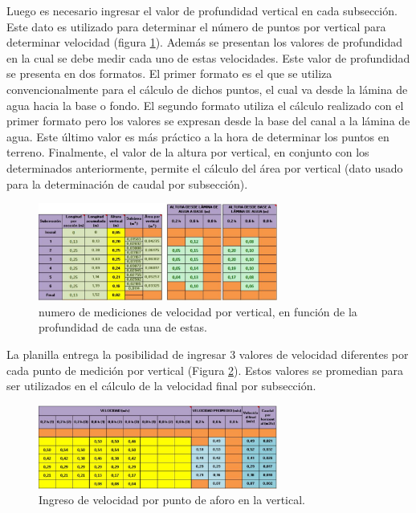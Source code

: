 \documentclass[]{article}
\begin{document}
Luego es necesario ingresar el valor de profundidad vertical en cada subsección. Este dato es utilizado para determinar el número de puntos por vertical para determinar velocidad (figura \ref{pto_vert}). Además se presentan los valores de profundidad en la cual se debe medir cada uno de estas velocidades. Este valor de profundidad se presenta en dos formatos. El primer formato es el que se utiliza convencionalmente para el cálculo de dichos puntos, el cual va desde la lámina de agua hacia la base o fondo. El segundo formato utiliza el cálculo realizado con el primer formato pero los valores se expresan desde la base del canal a la lámina de agua. Este último valor es más práctico a la hora de determinar los puntos en terreno. Finalmente, el valor de la altura por vertical, en conjunto con los determinados anteriormente, permite el cálculo del área por vertical (dato usado para la determinación de caudal por subsección). 

\begin{figure}[H]
\centering
\includegraphics[width=0.7\textwidth]{images/puntos_vertical.eps}
\caption{numero de mediciones de velocidad por vertical, en función de la profundidad de cada una de estas.}
\label{pto_vert}
\end{figure}

La planilla entrega la posibilidad de ingresar 3 valores de velocidad diferentes por cada punto de medición por vertical (Figura \ref{ing_veloc}). Estos valores se promedian para ser utilizados en el cálculo de la velocidad final por subsección.

 \begin{figure}[H]
\centering
\includegraphics[width=0.7\textwidth]{images/ingreso_veloc.eps}
\caption{Ingreso de velocidad por punto de aforo en la vertical.}
\label{ing_veloc}
\end{figure}
\end{document}
